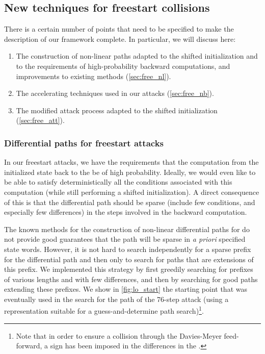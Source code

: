 \subsection{New techniques for freestart collisions}
\label{sec:attack_techs}

There is a certain number of points that need to be specified to make the description of our framework complete. In particular, we will discuss here:
\begin{enumerate}
\item The construction of non-linear paths adapted to the shifted initialization and to the requirements of high-probability backward computations, and improvements to existing
methods (\autoref{sec:free_nl}).
\item The accelerating techniques used in our attacks (\autoref{sec:free_nb}).
\item The modified attack process adapted to the shifted initialization (\autoref{sec:free_att}).
\end{enumerate}

\subsubsection{Differential paths for freestart attacks}
\label{sec:free_nl}

In our freestart attacks, we have the requirements that the computation from the initialized state back to the \iv be of high probability. Ideally, we would even like to be able to satisfy deterministically
all the conditions associated with this computation (while still performing a shifted initialization). A direct consequence of this is that the differential path should be sparse (\ie include few
conditions, and especially few differences) in the steps involved in the backward computation.

The known methods for the construction of non-linear differential paths for \sha do not provide good guarantees that the path will be sparse in \emph{a priori} specified state words. However, it is
not hard to search independently for a sparse prefix for the differential path and then only to search for paths that are extensions of this prefix.
We implemented this strategy by first greedily searching for prefixes of various lengths and with few differences, and then by searching for good paths extending these prefixes.
We show in \autoref{fig:lo_start} the starting point that was eventually used in the search for the path of the 76-step attack (using a representation suitable for a guess-and-determine
path search)\footnote{Note that in order to ensure a collision through the Davies-Meyer feed-forward, a sign has been imposed in the differences in the \iv.}.

